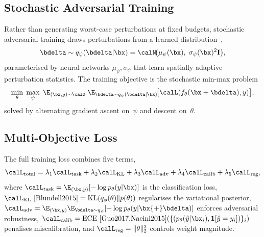 \subsection{Stochastic Adversarial Training}

Rather than generating worst-case perturbations at fixed budgets, stochastic adversarial training draws perturbations from a learned distribution~\cite{Madry2018,Zhang2019trades,Shafahi2019},
\begin{equation}
\bdelta\sim q_\psi(\bdelta|\bx)
= \calN\!\bigl(\mu_\psi(\bx),\;\sigma_\psi(\bx)^2\mathbf{I}\bigr),
\label{eq:stoch_pert_dist}
\end{equation}
parameterised by neural networks $\mu_\psi,\sigma_\psi$ that learn spatially adaptive perturbation statistics. The training objective is the stochastic min-max problem
\begin{equation}
\min_\theta\;\max_\psi\;
\E_{(\bx,y)\sim\calD}\;
\E_{\bdelta\sim q_\psi(\bdelta|\bx)}\!
\bigl[\calL(f_\theta(\bx+\bdelta),y)\bigr],
\label{eq:stoch_adv_obj}
\end{equation}
solved by alternating gradient ascent on~$\psi$ and descent on~$\theta$.

\subsection{Multi-Objective Loss}

The full training loss combines five terms,
\begin{equation}
\calL_{\mathrm{total}}
= \lambda_1\calL_{\mathrm{task}}
+ \lambda_2\calL_{\mathrm{KL}}
+ \lambda_3\calL_{\mathrm{adv}}
+ \lambda_4\calL_{\mathrm{calib}}
+ \lambda_5\calL_{\mathrm{reg}},
\label{eq:stoch_total_loss}
\end{equation}
where $\calL_{\mathrm{task}}=\E_{(\bx,y)}[-\log p_\theta(y|\bx)]$ is the classification loss, $\calL_{\mathrm{KL}}~\cite{Blundell2015}=\mathrm{KL}(q_\phi(\theta)\|p(\theta))$ regularises the variational posterior, $\calL_{\mathrm{adv}}=\E_{(\bx,y)}\E_{\bdelta\sim q_\psi}[-\log p_\theta(y|\bx{+}\bdelta)]$ enforces adversarial robustness, $\calL_{\mathrm{calib}}=\mathrm{ECE}~\cite{Guo2017,Naeini2015}(\{(p_\theta(\hat{y}|\bx_i),\mathbf{1}[\hat{y}=y_i])\}_i)$ penalises miscalibration, and $\calL_{\mathrm{reg}}=\|\theta\|_2^2$ controls weight magnitude.

